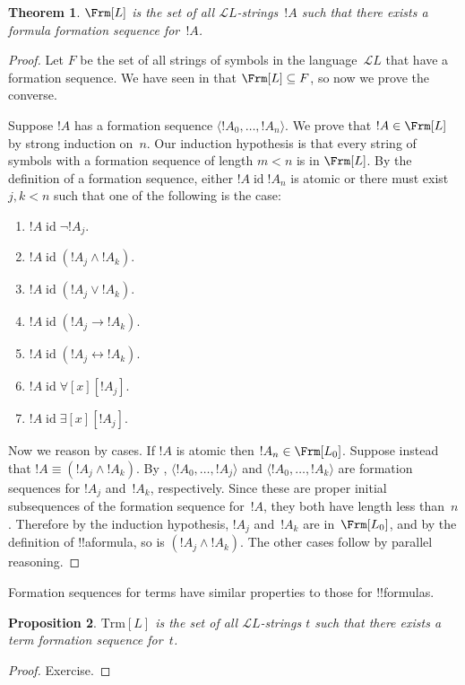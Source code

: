 \documentclass[10pt,a4paper]{article}
\makeatletter
\theoremstyle{plain}
\newtheorem{thm}{Theorem}[section]
\newtheorem{prop}[thm]{Proposition}
\theoremstyle{definition}
\theoremstyle{remark}
\newcommand*{\ollabel}[1]{\label{#1}}
\newcommand{\olref}{\@ifnextchar[{\olref@i}{\olref@final}}
\def\olref@i[#1]{\@ifnextchar[{\olref@ii}{\olref@final}}
\def\olref@ii[#1]{\@ifnextchar[{\olref@iii}{\olref@final}}
\def\olref@iii[#1]{\olref@final}
\def\olref@final#1{\ref{#1}}
\providecommand{\lif}{\mathbin{\rightarrow}}
\providecommand{\lforall}{\mathord{\forall}}
\providecommand{\lexists}{\mathord{\exists}}
\providecommand{\Lang}{\ensuremath{\mathcal{L}}}
\providecommand{\tuple}[1]{\langle #1 \rangle}
\providecommand{\tagitem}[1]{\item[#1]}
\providecommand{\liff}{\mathbin{\leftrightarrow}}
\providecommand{\Trm}{\mathrm{Trm}}
\providecommand{\ident}{\operatorname{id}}
\makeatother
\begin{document}
\begin{thm}
\ollabel{thm:fseq-frm-equiv}
$\Frm[L]$ is the set of all $\Lang L$-strings~$!A$ such that
there exists a formula formation sequence for~$!A$.
\end{thm}

\begin{proof}
Let $F$ be the set of all strings of symbols in the language~$\Lang L$
that have a formation sequence. We have seen in
\olref[fol][syn][fseq]{prop:formed} that $\Frm[L] \subseteq F$, so now
we prove the converse.

Suppose $!A$ has a formation sequence $\tuple{!A_0,\dotsc,!A_n}$.
We prove that $!A \in \Frm[L]$ by strong induction on~$n$.
Our induction hypothesis is that every string of symbols with a
formation sequence of length $m < n$ is in $\Frm[L]$.
By the definition of a formation sequence, either $!A \ident !A_n$ is
atomic or there must exist $j,k < n$ such that one of the
following is the case:
\begin{enumerate}
    \tagitem{prvNot}{$!A \ident \lnot !A_j$.}{}%
    \tagitem{prvAnd}{$!A \ident (!A_j \land !A_k)$.}{}%
    \tagitem{prvOr}{$!A \ident (!A_j \lor !A_k)$.}{}%
    \tagitem{prvIf}{$!A \ident (!A_j \lif !A_k)$.}{}%
    \tagitem{prvIff}{$!A \ident (!A_j \liff !A_k)$.}{}%
    \tagitem{prvAll}{$!A \ident \lforall[x][!A_j]$.}{}%
    \tagitem{prvEx}{$!A \ident \lexists[x][!A_j]$.}{}%
\end{enumerate}
Now we reason by cases. If $!A$ is atomic then
$!A_n \in \Frm[L_0]$. Suppose instead that
$!A \equiv (!A_j \land !A_k)$. By 
\olref[fol][syn][fseq]{lem:fseq-init},
$\tuple{!A_0,\dotsc,!A_j}$ and $\tuple{!A_0,\dotsc,!A_k}$ are
formation sequences for $!A_j$ and~$!A_k$, respectively. Since
these are proper initial subsequences of the formation sequence
for~$!A$, they both have length less than~$n$. Therefore by
the induction hypothesis, $!A_j$ and~$!A_k$ are in~$\Frm[L_0]$,
and by the definition of !!a{formula}, so is
$(!A_j \land !A_k)$. The other cases follow by parallel
reasoning.
\end{proof}

Formation sequences for terms have similar properties to those
for !!{formula}s.

\begin{prop}
\ollabel{prop:fseq-trm-equiv}
$\Trm[L]$ is the set of all $\Lang L$-strings $t$
such that there exists a term formation sequence for~$t$.
\end{prop}

\begin{proof}
Exercise.
\end{proof}
\end{document}
